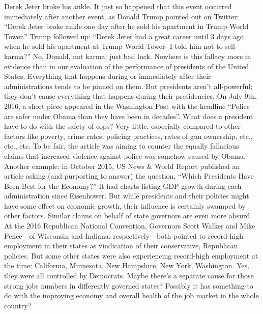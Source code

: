 Derek Jeter broke his ankle. It just so happened that this event occurred immediately after another
event, as Donald Trump pointed out on Twitter: “Derek Jeter broke ankle one day after he sold his
apartment in Trump World Tower.” Trump followed up: “Derek Jeter had a great career until 3
days ago when he sold his apartment at Trump World Tower- I told him not to sell- karma?” No,
Donald, not karma; just bad luck.
Nowhere is this fallacy more in evidence than in our evaluation of the performance of presidents
of the United States. Everything that happens during or immediately after their administrations
tends to be pinned on them. But presidents aren’t all-powerful; they don’t cause everything that
happens during their presidencies. On July 9th, 2016, a short piece appeared in the Washington
Post with the headline “Police are safer under Obama than they have been in decades”. What does
a president have to do with the safety of cops? Very little, especially compared to other factors like
poverty, crime rates, policing practices, rates of gun ownership, etc., etc., etc. To be fair, the article
was aiming to counter the equally fallacious claims that increased violence against police was
somehow caused by Obama. Another example: in October 2015, US News & World Report
published an article asking (and purporting to answer) the question, “Which Presidents Have Been
Best for the Economy?” It had charts listing GDP growth during each administration since
Eisenhower. But while presidents and their policies might have some effect on economic growth,
their influence is certainly swamped by other factors. Similar claims on behalf of state governors
are even more absurd. At the 2016 Republican National Convention, Governors Scott Walker and
Mike Pence—of Wisconsin and Indiana, respectively—both pointed to record-high employment
in their states as vindication of their conservative, Republican policies. But some other states were
also experiencing record-high employment at the time: California, Minnesota, New Hampshire,
New York, Washington. Yes, they were all controlled by Democrats. Maybe there’s a separate
cause for those strong jobs numbers in differently governed states? Possibly it has something to
do with the improving economy and overall health of the job market in the whole country?

